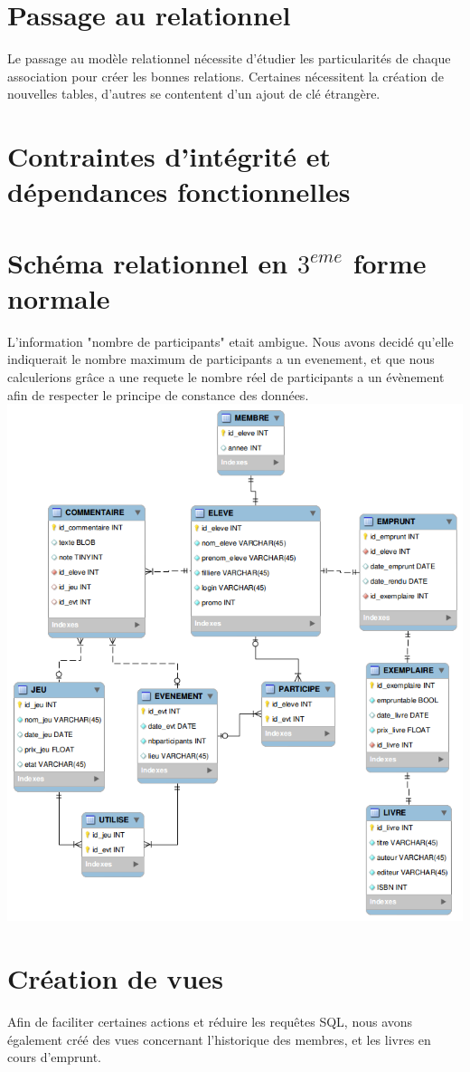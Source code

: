 \documentclass[a4paper, 11pt]{article}
\begin{document}
\section{Passage au relationnel}
Le passage au modèle relationnel nécessite d'étudier les particularités de chaque association pour créer les bonnes relations. Certaines nécessitent la création de nouvelles tables, d'autres se contentent d'un ajout de clé étrangère.
\section{Contraintes d'intégrité et dépendances fonctionnelles}
\section{Schéma relationnel en $3^{eme}$ forme normale}
L'information "nombre de participants" etait ambigue. Nous avons decidé qu'elle indiquerait le nombre maximum de participants a un evenement, et que nous calculerions grâce a une requete le nombre réel de participants a un évènement afin de respecter le principe de constance des données.
\includegraphics[width=1.2\textwidth]{relationnel.png}
\section{Création de vues}
Afin de faciliter certaines actions et réduire les requêtes SQL, nous avons également créé des vues concernant l'historique des membres, et les livres en cours d'emprunt.
\end{document}
